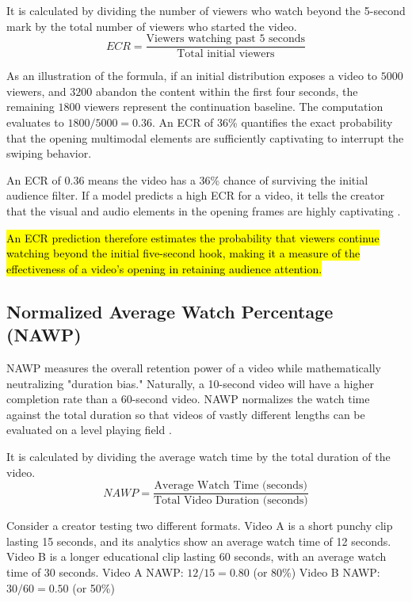 It is calculated by dividing the number of viewers who watch beyond the 5-second mark by the total number of viewers who started the video.$$ECR=\frac{\text{Viewers watching past 5 seconds}}{\text{Total initial viewers}}$$

As an illustration of the formula, if an initial distribution exposes a video to $5000$ viewers, and $3200$ abandon the content within the first four seconds, the remaining $1800$ viewers represent the continuation baseline. The computation evaluates to $1800/5000 = 0.36$. An ECR of 36\% quantifies the exact probability that the opening multimodal elements are sufficiently captivating to interrupt the swiping behavior.


An ECR of 0.36 means the video has a 36\% chance of surviving the initial audience filter. If a model predicts a high ECR for a video, it tells the creator that the visual and audio elements in the opening frames are highly captivating  \cite{li2024delving}.

\hl{An ECR prediction therefore estimates the probability that viewers continue watching beyond the initial five-second hook, making it a measure of the effectiveness of a video's opening in retaining audience attention.}

\subsection{Normalized Average Watch Percentage (NAWP)}

NAWP measures the overall retention power of a video while mathematically neutralizing "duration bias." Naturally, a 10-second video will have a higher completion rate than a 60-second video. NAWP normalizes the watch time against the total duration so that videos of vastly different lengths can be evaluated on a level playing field \cite{li2024delving}.

It is calculated by dividing the average watch time by the total duration of the video.$$NAWP=\frac{\text{Average Watch Time (seconds)}}{\text{Total Video Duration (seconds)}}$$

Consider a creator testing two different formats. Video A is a short punchy clip lasting 15 seconds, and its analytics show an average watch time of 12 seconds. Video B is a longer educational clip lasting 60 seconds, with an average watch time of 30 seconds. Video A NAWP: $12/15=0.80$ (or 80\%) Video B NAWP: $30/60=0.50$ (or 50\%)

